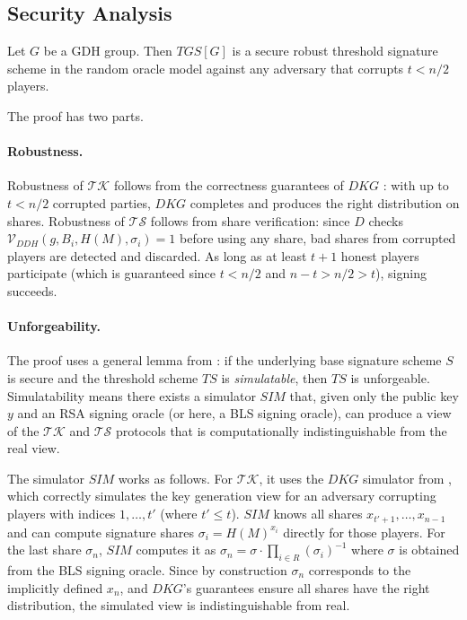 \subsection{Security Analysis}

\begin{theorem}
Let $G$ be a GDH group. Then $TGS[G]$ is a secure robust threshold signature scheme in
the random oracle model against any adversary that corrupts $t < n/2$ players.
\end{theorem}

The proof has two parts.

\paragraph{Robustness.} Robustness of $\mathcal{TK}$ follows from the correctness
guarantees of $DKG$ \cite{GJKR99}: with up to $t < n/2$ corrupted parties, $DKG$
completes and produces the right distribution on shares. Robustness of $\mathcal{TS}$
follows from share verification: since $D$ checks
$\mathcal{V}_{DDH}(g, B_i, H(M), \sigma_i) = 1$ before using any share, bad shares from
corrupted players are detected and discarded. As long as at least $t+1$ honest players
participate (which is guaranteed since $t < n/2$ and $n - t > n/2 > t$), signing
succeeds.

\paragraph{Unforgeability.} The proof uses a general lemma from \cite{GJKR96}: if the
underlying base signature scheme $S$ is secure and the threshold scheme $TS$ is
\emph{simulatable}, then $TS$ is unforgeable. Simulatability means there exists a
simulator $SIM$ that, given only the public key $y$ and an RSA signing oracle (or here,
a BLS signing oracle), can produce a view of the $\mathcal{TK}$ and $\mathcal{TS}$
protocols that is computationally indistinguishable from the real view.

The simulator $SIM$ works as follows. For $\mathcal{TK}$, it uses the $DKG$ simulator
from \cite{GJKR99}, which correctly simulates the key generation view for an adversary
corrupting players with indices $1, \ldots, t'$ (where $t' \leq t$). $SIM$ knows all
shares $x_{t'+1}, \ldots, x_{n-1}$ and can compute signature shares $\sigma_i =
H(M)^{x_i}$ directly for those players. For the last share $\sigma_n$, $SIM$ computes
it as $\sigma_n = \sigma \cdot \prod_{i \in R} (\sigma_i)^{-1}$ where $\sigma$ is
obtained from the BLS signing oracle. Since by construction $\sigma_n$ corresponds to
the implicitly defined $x_n$, and $DKG$'s guarantees ensure all shares have the right
distribution, the simulated view is indistinguishable from real.

